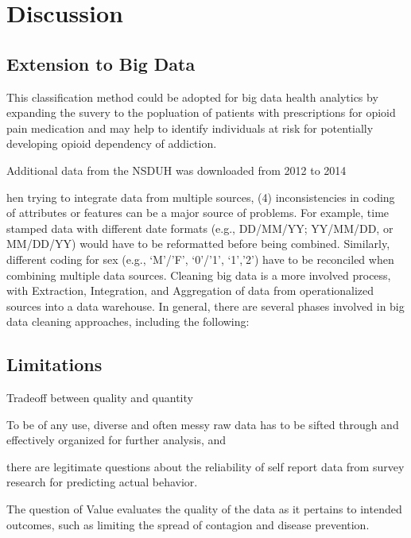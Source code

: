\documentclass[sigconf]{acmart}
\begin{document}
\section{Discussion}

\subsection{Extension to Big Data}

This classification method could be adopted for big data health analytics by
expanding the suvery to the popluation of patients with prescriptions for 
opioid pain medication and may help to identify individuals at risk for
potentially developing opioid dependency of addiction. 


Additional data from the NSDUH was downloaded from 2012 to 2014

hen trying to integrate data from multiple sources, (4) inconsistencies in coding of attributes or features can be a major source of problems. For example, time stamped data with different date formats (e.g., DD/MM/YY; YY/MM/DD, or MM/DD/YY) would have to be reformatted before being combined. Similarly, different coding for sex (e.g., ‘M’/’F’, ‘0’/’1’, ‘1’,’2’) have to be reconciled when combining multiple data sources. Cleaning big data is a more involved process, with Extraction, Integration, and Aggregation of data from operationalized sources into a data warehouse. In general, there are several phases involved in big data cleaning approaches, including the following:

\subsection{Limitations}

Tradeoff between quality and quantity


To be of any use, diverse and often messy raw data has to be sifted through and 
effectively organized for further analysis, and 


there are legitimate questions about the reliability of self report data from survey
research for predicting actual behavior. 

The question of 
Value evaluates the quality of the data as it pertains to intended outcomes, such 
as limiting the spread of contagion and disease prevention. 
\end{document}

